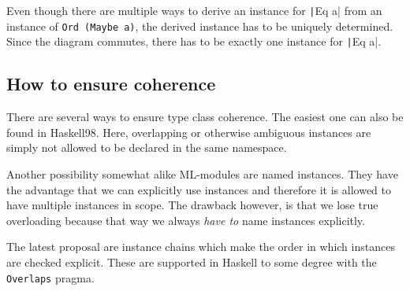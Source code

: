 Even though there are multiple ways to derive an instance for \texttt|Eq a| from an instance of \texttt{Ord (Maybe a)}, the derived instance has to be uniquely determined.
Since the diagram commutes, there has to be exactly one instance for \texttt|Eq a|.

\subsection{How to ensure coherence}

There are several ways to ensure type class coherence.
The easiest one can also be found in Haskell98.
Here, overlapping or otherwise ambiguous instances are simply not allowed to be declared in the same namespace.

Another possibility somewhat alike ML-modules are named instances.
They have the advantage that we can explicitly use instances and therefore it is allowed to have multiple instances in scope.
The drawback however, is that we lose true overloading because that way we always \emph{have to} name instances explicitly.

The latest proposal are instance chains which make the order in which instances are checked explicit. \cite{morris2010instance}
These are supported in Haskell to some degree with the \texttt{Overlaps} pragma.
